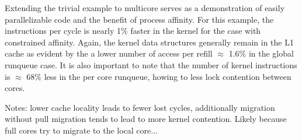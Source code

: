 \documentclass[11pt, twocolumn]{proc}
\begin{document}
Extending the trivial example to multicore serves as a demonstration of easily parallelizable code and the benefit of process affinity.  For this example, the instructions per cycle is nearly 1$\%$ faster in the kernel for the case with constrained affinity.  Again, the kernel data structures generally remain in the L1 cache as evident by the a lower number of access per refill $\approx$ 1.6$\%$ in the global runqueue case.  It is also important to note that the number of kernel instructions is $\approx$ 68$\%$ less in the per core runqueue, howing to less lock contention between cores.

\begin{table}[h!]
    \centering
    \caption{death - no pull sm}
\end{table}

\begin{table}[h!]
    \centering
    \caption{death - pulled sm}
\end{table}

Notes:  lower cache locality leads to fewer lost cycles, additionally migration without pull migration tends to lead to more kernel contention.  Likely because full cores try to migrate to the local core...
\end{document}
